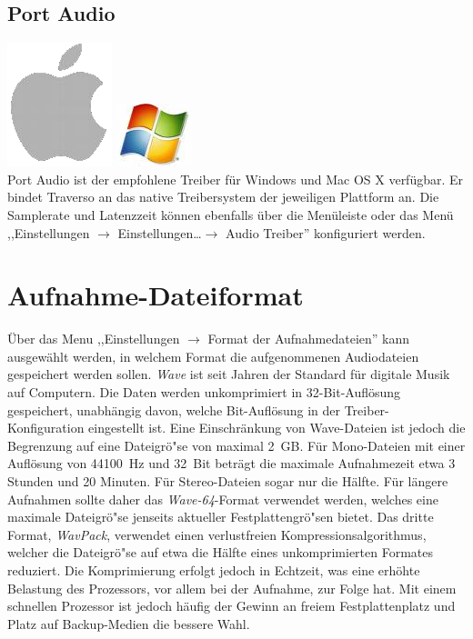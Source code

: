 \subsection{Port Audio}
\includegraphics[height=\baselineskip]{images/mac.png}
\includegraphics[height=\baselineskip]{images/win.png}
\\
Port Audio ist der empfohlene Treiber für Windows und Mac OS X verfügbar. Er bindet Traverso an das native Treibersystem der jeweiligen Plattform an. Die Samplerate und Latenzzeit können ebenfalls über die Menüleiste oder das Menü ,,Einstellungen $\rightarrow$ Einstellungen\dots $\rightarrow$ Audio Treiber'' konfiguriert werden.

\section{Aufnahme-Dateiformat}
Über das Menu ,,Einstellungen $\rightarrow$ Format der Aufnahmedateien'' kann ausgewählt werden, in welchem Format die aufgenommenen Audiodateien gespeichert werden sollen. \emph{Wave} ist seit Jahren der Standard für digitale Musik auf Computern. Die Daten werden unkomprimiert in 32-Bit-Auflösung gespeichert, unabhängig davon, welche Bit-Auflösung in der Treiber-Konfiguration eingestellt ist. Eine Einschränkung von Wave-Dateien ist jedoch die Begrenzung auf eine Dateigrö"se von maximal 2~GB. Für Mono-Dateien mit einer Auflösung von 44100~Hz und 32~Bit beträgt die maximale Aufnahmezeit etwa 3 Stunden und 20 Minuten. Für Stereo-Dateien sogar nur die Hälfte. Für längere Aufnahmen sollte daher das \emph{Wave-64}-Format verwendet werden, welches eine maximale Dateigrö"se jenseits aktueller Festplattengrö"sen bietet. Das dritte Format, \emph{WavPack}, verwendet einen verlustfreien Kompressionsalgorithmus, welcher die Dateigrö"se auf etwa die Hälfte eines unkomprimierten Formates reduziert. Die Komprimierung erfolgt jedoch in Echtzeit, was eine erhöhte Belastung des Prozessors, vor allem bei der Aufnahme, zur Folge hat. Mit einem schnellen Prozessor ist jedoch häufig der Gewinn an freiem Festplattenplatz und Platz auf Backup-Medien die bessere Wahl.
